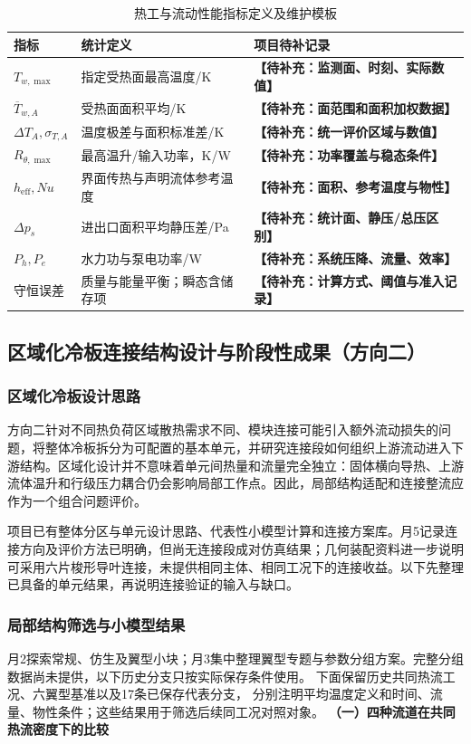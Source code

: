 \documentclass[stage2,UTF8,fontset=fandol]{ydzjreport}
\DeclareRobustCommand{\TBD}[1]{{\color{ydzjgrey}\textbf{【待补充：#1】}}}
\begin{document}
\begin{table}[htbp]
\centering\small
\caption{热工与流动性能指标定义及维护模板}\label{tab:06}
\begin{tabularx}{\linewidth}{lYY}
\toprule
{} 指标 & 统计定义 & 项目待补记录 \\
\midrule
$T_{w,\max}$ & 指定受热面最高温度/K & \TBD{监测面、时刻、实际数值} \\
$\overline T_{w,A}$ & 受热面面积平均/K & \TBD{面范围和面积加权数据} \\
$\Delta T_A,\sigma_{T,A}$ & 温度极差与面积标准差/K & \TBD{统一评价区域与数值} \\
$R_{\theta,\max}$ & 最高温升/输入功率，K/W & \TBD{功率覆盖与稳态条件} \\
$h_{\mathrm{eff}},Nu$ & 界面传热与声明流体参考温度 & \TBD{面积、参考温度与物性} \\
$\Delta p_s$ & 进出口面积平均静压差/Pa & \TBD{统计面、静压/总压区别} \\
$P_h,P_e$ & 水力功与泵电功率/W & \TBD{系统压降、流量、效率} \\
守恒误差 & 质量与能量平衡；瞬态含储存项 & \TBD{计算方式、阈值与准入记录} \\
\bottomrule
\end{tabularx}
\end{table}

\subsection{区域化冷板连接结构设计与阶段性成果（方向二）}
\label{ch:connection}
\subsubsection{区域化冷板设计思路}
方向二针对不同热负荷区域散热需求不同、模块连接可能引入额外流动损失的问题，将整体冷板拆分为可配置的基本单元，并研究连接段如何组织上游流动进入下游结构。区域化设计并不意味着单元间热量和流量完全独立：固体横向导热、上游流体温升和行级压力耦合仍会影响局部工作点。因此，局部结构适配和连接整流应作为一个组合问题评价。

项目已有整体分区与单元设计思路、代表性小模型计算和连接方案库。月5记录连接方向及评价方法已明确，但尚无连接段成对仿真结果；几何装配资料进一步说明可采用六片梭形导叶连接，未提供相同主体、相同工况下的连接收益。以下先整理已具备的单元结果，再说明连接验证的输入与缺口。

\subsubsection{局部结构筛选与小模型结果}
月2探索常规、仿生及翼型小块；月3集中整理翼型专题与参数分组方案。完整分组数据尚未提供，以下历史分支只按实际保存条件使用。
下面保留历史共同热流工况、六翼型基准以及17条已保存代表分支，
分别注明平均温度定义和时间、流量、物性条件；这些结果用于筛选后续同工况对照对象\cite{monthly2,monthly3}。
\textbf{（一）四种流道在共同热流密度下的比较}
\end{document}
